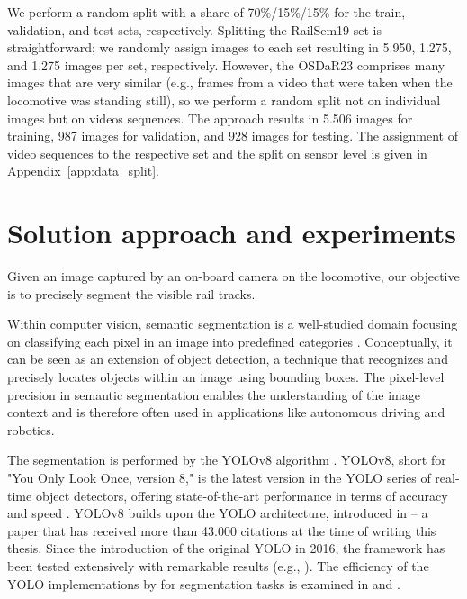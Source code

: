 \documentclass[Master,MDS,english]{BASE/twbook} %
\begin{document}
We perform a random split with a share of 70\%/15\%/15\% for the train, validation, and test sets, respectively. Splitting the RailSem19 set is straightforward; we randomly assign images to each set resulting in 5.950, 1.275, and 1.275 images per set, respectively. However, the OSDaR23 comprises many images that are very similar (e.g., frames from a video that were taken when the locomotive was standing still), so we perform a random split not on individual images but on videos sequences. The approach results in 5.506 images for training, 987 images for validation, and 928 images for testing.
The assignment of video sequences to the respective set and the split on sensor level is given in Appendix~\ref{app:data_split}.



\chapter{Solution approach and experiments} %

Given an image captured by an on-board camera on the locomotive, our objective is to precisely segment the visible rail tracks. %

Within computer vision, semantic segmentation is a well-studied domain focusing on classifying each pixel in an image into predefined categories \citep{MO2022626}. Conceptually, it 
can be seen as an extension of object detection, a technique that recognizes and precisely locates objects within an image using bounding boxes.
The pixel-level precision in semantic segmentation enables the understanding of the image context and is therefore often used in applications like autonomous driving and robotics.

 The segmentation is performed by the YOLOv8 algorithm \citep{Jocher_Ultralytics_YOLO_2023}.  YOLOv8, short for "You Only Look Once, version 8," is the latest version in the YOLO series of real-time object detectors, offering state-of-the-art performance in terms of accuracy and speed \citep{ultralytics_docs}. YOLOv8 builds upon the YOLO architecture, introduced in \cite{redmon2016you} -- a paper that has received more than 43.000 citations at the time of writing this thesis. Since the introduction of the original YOLO in 2016, the framework has been tested extensively with remarkable results (e.g., \cite{JIANG20221066, cryptography6020016, Diwan2023}). The efficiency of the YOLO implementations by \cite{Jocher_Ultralytics_YOLO_2023} for segmentation tasks is examined in \cite{agriculture13081643} and \cite{STRAKER2023100045}.
\end{document}

